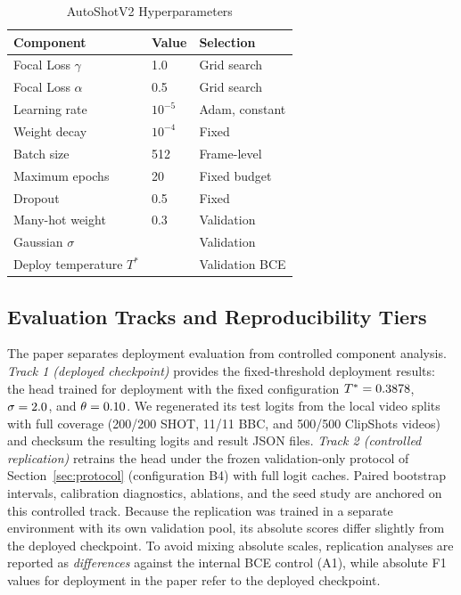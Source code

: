 \begin{table}[!t]
\caption{AutoShotV2 Hyperparameters}
\label{tab:hyperparams}
\centering
\small
\renewcommand{\arraystretch}{1.08}
\begin{tabular}{L{1.25in}C{0.7in}L{0.85in}}
\toprule
\textbf{Component} & \textbf{Value} & \textbf{Selection} \\
\midrule
Focal Loss $\gamma$ & 1.0 & Grid search \\
Focal Loss $\alpha$ & 0.5 & Grid search \\
Learning rate & $10^{-5}$ & Adam, constant \\
Weight decay & $10^{-4}$ & Fixed \\
Batch size & 512 & Frame-level \\
Maximum epochs & 20 & Fixed budget \\
Dropout & 0.5 & Fixed \\
Many-hot weight & 0.3 & Validation \\
Gaussian $\sigma$ & \PaperGaussianSigma{} & Validation \\
Deploy temperature $T^{*}$ & \PaperDeployTemperature{} & Validation BCE \\
\bottomrule
\end{tabular}
\vspace{0.5ex}
\end{table}

\subsection{Evaluation Tracks and Reproducibility Tiers}
\label{sec:tracks}

The paper separates deployment evaluation from controlled component analysis.
\emph{Track 1 (deployed checkpoint)} provides the fixed-threshold deployment results: the head
trained for deployment with the fixed configuration
$T^{*}=0.3878$, $\sigma=2.0$, and
$\theta=0.10$. We regenerated its test logits from the local
video splits with full coverage (200/200 SHOT, 11/11 BBC, and 500/500
ClipShots videos) and checksum the resulting logits and result JSON files.
\emph{Track 2 (controlled replication)} retrains the head under the frozen
validation-only protocol of Section~\ref{sec:protocol} (configuration B4) with
full logit caches. Paired bootstrap intervals, calibration diagnostics,
ablations, and the seed study are anchored on this controlled track. Because
the replication was trained in a separate environment with its own validation
pool, its absolute scores differ slightly from the deployed checkpoint. To
avoid mixing absolute scales, replication analyses are reported as
\emph{differences} against the internal BCE control (A1), while absolute F1
values for deployment in the paper refer to the deployed checkpoint.

